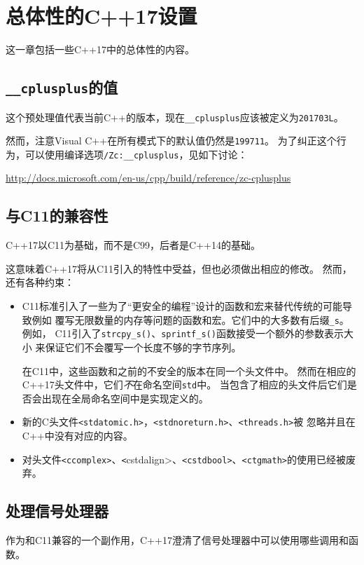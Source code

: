 \chapter{总体性的C++17设置}\label{ch34}
这一章包括一些C++17中的总体性的内容。


\section{\texttt{\_\_cplusplus}的值}
这个预处理值代表当前C++的版本，现在\texttt{\_\_cplusplus}应该被定义为\texttt{201703L}。

然而，注意Visual C++在所有模式下的默认值仍然是\texttt{199711}。
为了纠正这个行为，可以使用编译选项\texttt{/Zc:\_\_cplusplus}，见如下讨论：

\url{http://docs.microsoft.com/en-us/cpp/build/reference/zc-cplusplus}


\section{与C11的兼容性}
C++17以C11为基础，而不是C99，后者是C++14的基础。

这意味着C++17将从C11引入的特性中受益，但也必须做出相应的修改。
然而，还有各种约束：
\begin{itemize}
    \item C11标准引入了一些为了“更安全的编程”设计的函数和宏来替代传统的可能导致例如
    覆写无限数量的内存等问题的函数和宏。它们中的大多数有后缀\texttt{\_s}。例如，
    C11引入了\texttt{strcpy\_s()}、\texttt{sprintf\_s()}函数接受一个额外的参数表示大小
    来保证它们不会覆写一个长度不够的字节序列。

    在C11中，这些函数和之前的不安全的版本在同一个头文件中。
    然而在相应的C++17头文件中，它们\emph{不}在命名空间\texttt{std}中。
    当包含了相应的头文件后它们是否会出现在全局命名空间中是实现定义的。
    \item 新的C头文件\texttt{<stdatomic.h>}，\texttt{<stdnoreturn.h>}、\texttt{<threads.h>}被
    忽略并且在C++中没有对应的内容。
    \item 对头文件\texttt{<ccomplex>}、\texttt<{cstdalign>}、\texttt{<cstdbool>}、\texttt{<ctgmath>}的使用已经被废弃。
\end{itemize}

\section{处理信号处理器}
作为和C11兼容的一个副作用，C++17澄清了信号处理器中可以使用哪些调用和函数。

